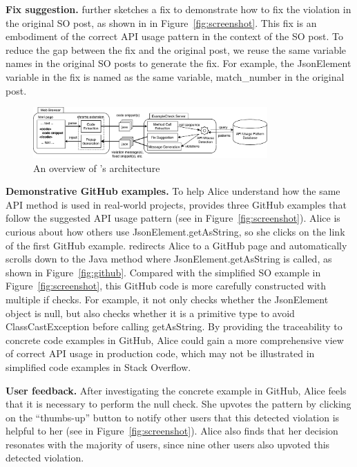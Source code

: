 {\bf Fix suggestion.} {\tool} further sketches a fix to demonstrate how to fix the violation in the original SO post, as shown in  in Figure~\ref{fig:screenshot}. This fix is an embodiment of the correct API usage pattern in the context of the SO post. To reduce the gap between the fix and the original post, we reuse the same variable names in the original SO posts to generate the fix. For example, the {\ttt JsonElement} variable in the fix is named as the same variable, {\ttt match\_number} in the original post.

\begin{figure}[!th]
\centering
\includegraphics[width=0.8\textwidth]{examplecheck-extension.pdf}
\caption{An overview of {\tool}'s architecture}
\label{fig:arch}
\end{figure}

{\bf Demonstrative GitHub examples.} To help Alice understand how the same API method is used in real-world projects, {\tool} provides three GitHub examples that follow the suggested API usage pattern (see  in Figure~\ref{fig:screenshot}). Alice is curious about how others use {\ttt JsonElement.getAsString}, so she clicks on the link of the first GitHub example. {\tool} redirects Alice to a GitHub page and automatically scrolls down to the Java method where {\ttt JsonElement.getAsString} is called, as shown in Figure~\ref{fig:github}. Compared with the simplified SO example in Figure~\ref{fig:screenshot}, this GitHub code is more carefully constructed with multiple {\ttt if} checks. For example, it not only checks whether the {\ttt JsonElement} object is {\ttt null}, but also checks whether it is a primitive type to avoid {\ttt ClassCastException} before calling {\ttt getAsString}. By providing the traceability to concrete code examples in GitHub, Alice could gain a more comprehensive view of correct API usage in production code, which may not be illustrated in simplified code examples in Stack Overflow. 

{\bf User feedback.} After investigating the concrete example in GitHub, Alice feels that it is necessary to perform the {\ttt null} check. She upvotes the pattern by clicking on the ``thumbs-up'' button to notify other users that this detected violation is helpful to her (see  in Figure~\ref{fig:screenshot}). Alice also finds that her decision resonates with the majority of {\tool} users, since nine other users also upvoted this detected violation.

